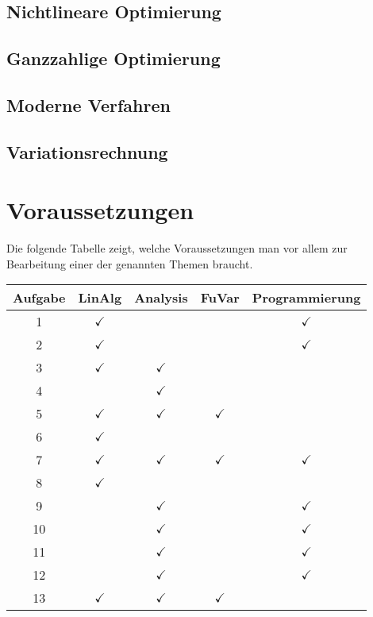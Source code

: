 \documentclass[a4paper,12pt]{article}
\begin{document}
\subsection{Nichtlineare Optimierung}





\subsection{Ganzzahlige Optimierung}


\subsection{Moderne Verfahren}





\subsection{Variationsrechnung}


\section{Voraussetzungen}
Die folgende Tabelle zeigt, welche Voraussetzungen man vor allem
zur Bearbeitung einer der genannten Themen braucht.
\begin{center}
\begin{tabular}{|c|c|c|c|c|}
\hline
Aufgabe&LinAlg&Analysis&FuVar&Programmierung\\
\hline
 1&$\checkmark$&            &            &$\checkmark$\\
 2&$\checkmark$&            &            &$\checkmark$\\
 3&$\checkmark$&$\checkmark$&            &            \\
 4&            &$\checkmark$&            &            \\
 5&$\checkmark$&$\checkmark$&$\checkmark$&            \\
 6&$\checkmark$&            &            &            \\
 7&$\checkmark$&$\checkmark$&$\checkmark$&$\checkmark$\\
 8&$\checkmark$&            &            &            \\
 9&            &$\checkmark$&            &$\checkmark$\\
10&            &$\checkmark$&            &$\checkmark$\\
11&            &$\checkmark$&            &$\checkmark$\\
12&            &$\checkmark$&            &$\checkmark$\\
13&$\checkmark$&$\checkmark$&$\checkmark$&            \\
\hline
\end{tabular}
\end{center}
\end{document}
